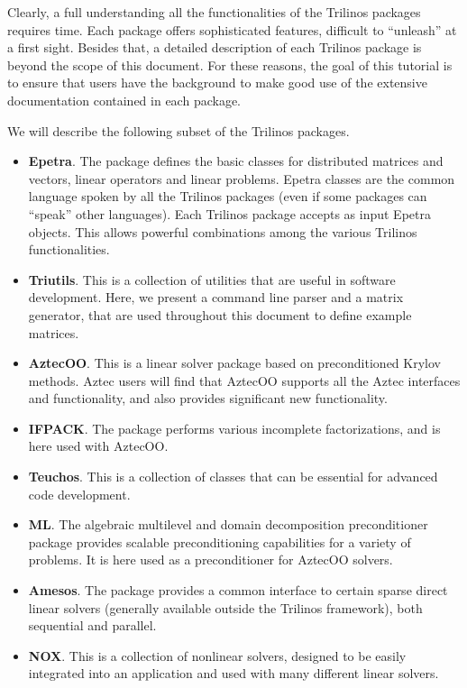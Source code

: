 Clearly, a full understanding all the functionalities of the Trilinos
packages requires time.  Each package offers sophisticated features,
difficult to ``unleash'' at a first sight.  Besides that, a detailed
description of each Trilinos package is beyond the scope of this
document. For these reasons, the goal of this tutorial is to ensure that
users have the background to make good use of the extensive
documentation contained in each package.

\medskip

We will describe the following subset of the Trilinos packages.
\begin{itemize} 
\item {\bf Epetra}. The package defines the basic classes for
  distributed matrices and vectors, linear operators and linear
  problems. Epetra classes are the common language spoken by all the
  Trilinos packages (even if some packages can ``speak'' other
  languages). Each Trilinos package accepts as input Epetra objects.
  This allows powerful combinations among the various Trilinos
  functionalities.
\item {\bf Triutils}. This is a collection of utilities that are useful
  in software development. Here, we present a command line parser and a
  matrix generator, that are used throughout this document to define
  example matrices.
\item {\bf AztecOO}. This is a linear solver package based on
  preconditioned Krylov methods. Aztec users will find that AztecOO
  supports all the Aztec interfaces and functionality, and also provides
  significant new functionality.
\item {\bf IFPACK}. The package performs various incomplete
  factorizations, and is here used with AztecOO.
\item {\bf Teuchos}. This is a collection of classes that can be
  essential for advanced code development.
\item {\bf ML}. The algebraic multilevel and domain decomposition
  preconditioner package provides scalable preconditioning capabilities
  for a variety of problems. It is here used as a preconditioner
  for AztecOO solvers.
\item {\bf Amesos}. The package provides a common interface to certain
  sparse direct linear solvers (generally available outside the Trilinos
  framework), both sequential and parallel.
\item {\bf NOX}. This is a collection of nonlinear solvers, designed to
  be easily integrated into an application and used with many different
  linear solvers.
\end{itemize}

